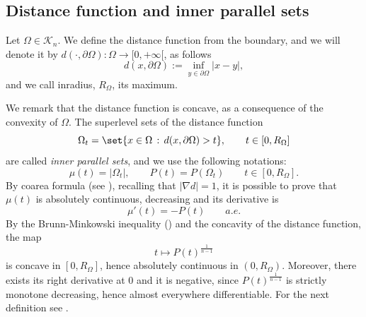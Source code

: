 \documentclass[oneside,a4paper,11pt,notitlepage]{article}
\newcommand{\abs}[1]{{\left|#1\right|}}
\theoremstyle{definition}
\theoremstyle{plain}
\theoremstyle{definition}
\begin{document}
 \subsection{Distance function and inner parallel sets} \label{innere}
Let $\Omega\in \mathcal{K}_n$. We define the distance function from the boundary, and we will denote it by $ d(\cdot, \partial \Omega):\Omega \to [0,+\infty[$, as follows 
 \begin{equation*}
     d(x,\partial\Omega):=\inf_{y\in\partial\Omega}\abs{x-y},
 \end{equation*}
 and we call inradius, $R_\Omega$, its maximum.
 
We remark that the distance function is concave, as a consequence of the convexity of $\Omega$.
The superlevel sets of the distance function
\begin{equation*}
    \Omega_t=\set{x\in \Omega \, : \, d(x,\partial\Omega)>t}, \qquad t\in[0, R_\Omega]
\end{equation*}
 are called \emph{inner parallel sets}, and we use the following notations:
 \begin{equation*}
 \mu(t)= \abs{\Omega_t}, \qquad P(t)=P(\Omega_t)\qquad t\in[0, R_\Omega].
 \end{equation*}
 By coarea formula (see \cite{maggi2012sets}), recalling that $\abs{\nabla d}=1$, it is possible to prove that $\mu(t)$ is absolutely continuous, decreasing and its derivative is  
\begin{equation}\label{eq:dermu}
    \mu'(t)=-P(t)\qquad a.e.
\end{equation}
By the Brunn-Minkowski inequality (\cite[Theorem 7.4.5]{schneider}) and the concavity of the distance function, the map
\begin{equation*}
    t \mapsto P(t)^{\frac{1}{n-1}}
\end{equation*}
is concave in $[0,R_{\Omega}]$, hence absolutely continuous in $(0,R_{\Omega})$. Moreover, there exists its right derivative at $0$ and it is negative, since $P(t)^{\frac{1}{n-1}}$ is strictly monotone decreasing, hence almost everywhere differentiable. For the next definition see \cite{schneider}.
\end{document}
